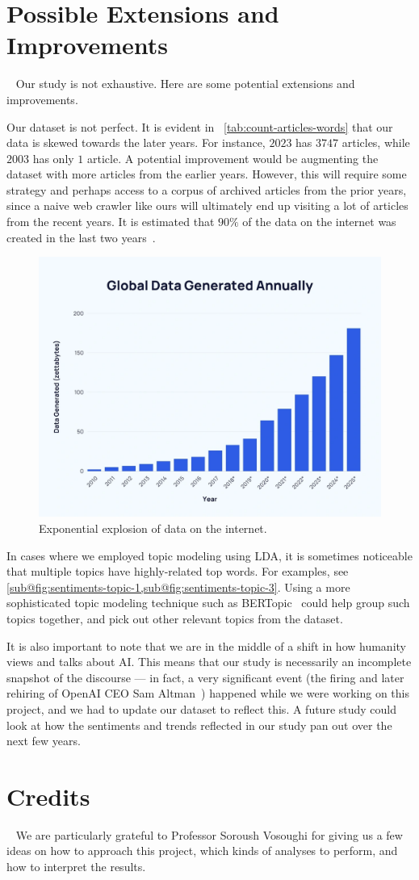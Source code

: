 \section{Possible Extensions and Improvements}~\label{sec:conclusion}
Our study is not exhaustive. Here are some potential extensions and improvements.
\begin{enumarabic}
  \item Our dataset is not perfect. It is evident in
    ~\cref{tab:count-articles-words} that our data is skewed towards the later years.
    For instance, $2023$ has $3747$ articles, while $2003$ has only $1$ article.
    A potential improvement would be augmenting the dataset with more articles from the earlier years.
    However, this will require some strategy and perhaps access to a corpus of archived articles
    from the prior years, since a naive web crawler like ours will ultimately
    end up visiting a lot of articles from the recent years.
    It is estimated that $90\%$ of the data on the internet was created
    in the last two years~\cite{data-explosion}.

    \begin{figure}[H]
      \centering
      \includegraphics[width=.7\textwidth]{figures/data-explosion.png}
      \caption{Exponential explosion of data on the internet.~\cite{data-explosion}}
    \end{figure}

  \item In cases where we employed topic modeling using LDA,
    it is sometimes noticeable that multiple topics have highly-related top words.
    For examples, see \cref{sub@fig:sentiments-topic-1,sub@fig:sentiments-topic-3}.
    Using a more sophisticated topic modeling technique such as BERTopic~\cite{BERTopic}
    could help group such topics together, and pick out other relevant topics
    from the dataset.
  \item It is also important to note that we are in the middle of a shift
    in how humanity views and talks about AI.
    This means that our study is necessarily an incomplete snapshot of the discourse
    --- in fact, a very significant event (the firing and later rehiring of OpenAI CEO
    Sam Altman~\cite{openai-ceo-event}) happened while we were working on this project,
    and we had to update our dataset to reflect this.
    A future study could look at how the sentiments and trends reflected in our study
    pan out over the next few years.
\end{enumarabic}

\section{Credits}~\label{sec:credits}
We are particularly grateful to Professor Soroush Vosoughi for giving us
a few ideas on how to approach this project,
which kinds of analyses to perform, and how to interpret the results.
